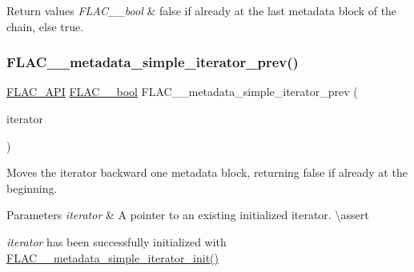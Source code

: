 \begin{DoxyRetVals}{Return values}
{\em F\+L\+A\+C\+\_\+\+\_\+bool} & {\ttfamily false} if already at the last metadata block of the chain, else {\ttfamily true}. \\
\hline
\end{DoxyRetVals}
\mbox{\label{group__flac__metadata__level1_ga49f495dec0f44116d66e1b79356a1160}} 
\subsubsection{\texorpdfstring{FLAC\_\_metadata\_simple\_iterator\_prev()}{FLAC\_\_metadata\_simple\_iterator\_prev()}}
{\footnotesize\ttfamily \mbox{\hyperlink{group__flac__export_ga56ca07df8a23310707732b1c0007d6f5}{F\+L\+A\+C\+\_\+\+A\+PI}} \mbox{\hyperlink{ordinals_8h_a95103469f1cbd78b8cf250194985b34e}{F\+L\+A\+C\+\_\+\+\_\+bool}} F\+L\+A\+C\+\_\+\+\_\+metadata\+\_\+simple\+\_\+iterator\+\_\+prev (\begin{DoxyParamCaption}\item[{\mbox{\hyperlink{group__flac__metadata__level1_ga6accccddbb867dfc2eece9ee3ffecb3a}{F\+L\+A\+C\+\_\+\+\_\+\+Metadata\+\_\+\+Simple\+Iterator}} $\ast$}]{iterator }\end{DoxyParamCaption})}

Moves the iterator backward one metadata block, returning {\ttfamily false} if already at the beginning.


\begin{DoxyParams}{Parameters}
{\em iterator} & A pointer to an existing initialized iterator. \textbackslash{}assert 
\begin{DoxyCode}{1}
\end{DoxyCode}
 {\itshape iterator} has been successfully initialized with \mbox{\hyperlink{group__flac__metadata__level1_ga2a055cca4e6e06ae62517c8b0fa6e8a3}{F\+L\+A\+C\+\_\+\+\_\+metadata\+\_\+simple\+\_\+iterator\+\_\+init()}} \\
\hline
\end{DoxyParams}

